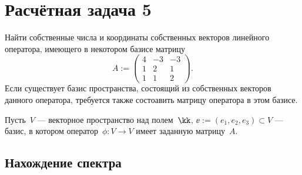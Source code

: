 \section{Расчётная задача 5}

Найти собственные числа и координаты собственных векторов линейного оператора, имеющего в некотором базисе матрицу
\[
	A :=
	\begin{pmatrix}
		4 & -3 & -3 \\
		1 & 2 & 1 \\
		1 & 1 & 2
	\end{pmatrix}
	.
\]
Если существует базис пространства, состоящий из собственных векторов данного оператора, требуется также состоавить матрицу оператора в этом базисе.

\begin{solution}
	Пусть~$V$ --- векторное пространство над полем~$\kk$, $\ee := (e_1, e_2, e_3) \subset V$ --- базис, в котором оператор~$\phi \colon V \to V$ имеет заданную матрицу~$A$.

	\subsection{Нахождение спектра}


\end{solution}
